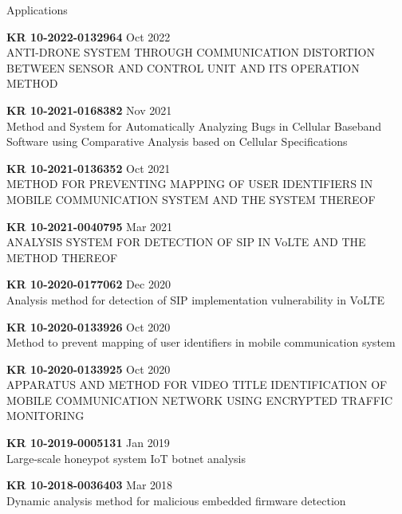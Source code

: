 \begin{timeenumerate}{Applications}{}
    \item \textbf{KR 10-2022-0132964} \hfill Oct 2022 \\
    {\small ANTI-DRONE SYSTEM THROUGH COMMUNICATION DISTORTION BETWEEN SENSOR AND CONTROL UNIT AND ITS OPERATION METHOD}
    
    \item \textbf{KR 10-2021-0168382} \hfill Nov 2021 \\
    {\small Method and System for Automatically Analyzing Bugs in Cellular Baseband Software using Comparative Analysis based on Cellular Specifications}
    
    \item \textbf{KR 10-2021-0136352} \hfill Oct 2021 \\
    {\small METHOD FOR PREVENTING MAPPING OF USER IDENTIFIERS IN MOBILE COMMUNICATION SYSTEM AND THE SYSTEM THEREOF}
    
    \item \textbf{KR 10-2021-0040795} \hfill Mar 2021 \\
    {\small ANALYSIS SYSTEM FOR DETECTION OF SIP IN VoLTE AND THE METHOD THEREOF}

    \item \textbf{KR 10-2020-0177062} \hfill Dec 2020 \\
    {\small Analysis method for detection of SIP implementation vulnerability in VoLTE}

    \item \textbf{KR 10-2020-0133926} \hfill Oct 2020 \\
    {\small Method to prevent mapping of user identifiers in mobile communication system}

    \item \textbf{KR 10-2020-0133925} \hfill Oct 2020 \\
    {\small APPARATUS AND METHOD FOR VIDEO TITLE IDENTIFICATION OF MOBILE
    COMMUNICATION NETWORK USING ENCRYPTED TRAFFIC MONITORING}

    \item \textbf{KR 10-2019-0005131} \hfill Jan 2019 \\
    {\small Large-scale honeypot system IoT botnet analysis}

    \item \textbf{KR 10-2018-0036403} \hfill Mar 2018 \\
    {\small Dynamic analysis method for malicious embedded firmware detection}


\end{timeenumerate}
